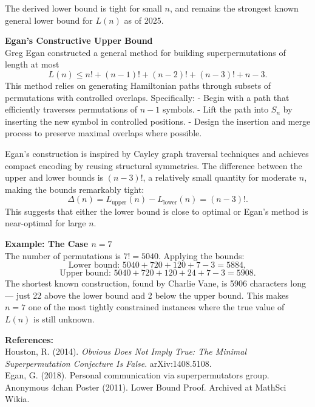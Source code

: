 \begin{technical}
The derived lower bound is tight for small \(n\), and remains the strongest known general lower bound for \(L(n)\) as of 2025.

\noindent\textbf{Egan’s Constructive Upper Bound}\\[0.5em]
Greg Egan constructed a general method for building superpermutations of length at most
\[
L(n) \le n! + (n-1)! + (n-2)! + (n-3)! + n - 3.
\]
This method relies on generating Hamiltonian paths through subsets of permutations with controlled overlaps. Specifically:
- Begin with a path that efficiently traverses permutations of \(n-1\) symbols.
- Lift the path into \(S_n\) by inserting the new symbol in controlled positions.
- Design the insertion and merge process to preserve maximal overlaps where possible.

Egan's construction is inspired by Cayley graph traversal techniques and achieves compact encoding by reusing structural symmetries. The difference between the upper and lower bounds is \((n-3)!\), a relatively small quantity for moderate \(n\), making the bounds remarkably tight:
\[
\Delta(n) = L_{\text{upper}}(n) - L_{\text{lower}}(n) = (n-3)!.
\]
This suggests that either the lower bound is close to optimal or Egan’s method is near-optimal for large \(n\).

\noindent\textbf{Example: The Case \(n = 7\)}\\[0.5em]
The number of permutations is \(7! = 5040\). Applying the bounds:
\[
\text{Lower bound: } 5040 + 720 + 120 + 7 - 3 = 5884,
\]
\[
\text{Upper bound: } 5040 + 720 + 120 + 24 + 7 - 3 = 5908.
\]
The shortest known construction, found by Charlie Vane, is 5906 characters long — just 22 above the lower bound and 2 below the upper bound. This makes \(n = 7\) one of the most tightly constrained instances where the true value of \(L(n)\) is still unknown.

\vspace{0.5em}
\noindent\textbf{References:}\\
Houston, R. (2014). \textit{Obvious Does Not Imply True: The Minimal Superpermutation Conjecture Is False}. arXiv:1408.5108.\\
Egan, G. (2018). Personal communication via superpermutators group.\\
Anonymous 4chan Poster (2011). Lower Bound Proof. Archived at MathSci Wikia.
\end{technical}
